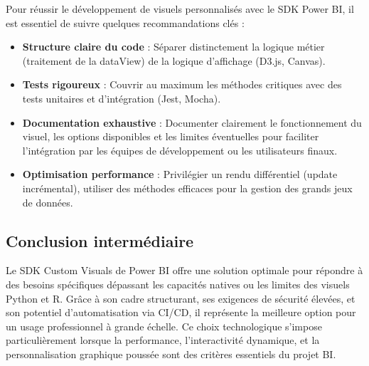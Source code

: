 Pour réussir le développement de visuels personnalisés avec le SDK Power BI, il est essentiel de suivre quelques recommandations clés :
\begin{itemize}
  \item \textbf{Structure claire du code} : Séparer distinctement la logique métier (traitement de la dataView) de la logique d’affichage (D3.js, Canvas).
  \item \textbf{Tests rigoureux} : Couvrir au maximum les méthodes critiques avec des tests unitaires et d’intégration (Jest, Mocha).\
  \item \textbf{Documentation exhaustive} : Documenter clairement le fonctionnement du visuel, les options disponibles et les limites éventuelles pour faciliter l’intégration par les équipes de développement ou les utilisateurs finaux.
  \item \textbf{Optimisation performance} : Privilégier un rendu différentiel (update incrémental), utiliser des méthodes efficaces pour la gestion des grands jeux de données.
\end{itemize}

\subsection*{Conclusion intermédiaire}

Le SDK Custom Visuals de Power BI offre une solution optimale pour répondre à des besoins spécifiques dépassant les capacités natives ou les limites des visuels Python et R. Grâce à son cadre structurant, ses exigences de sécurité élevées, et son potentiel d’automatisation via CI/CD, il représente la meilleure option pour un usage professionnel à grande échelle. Ce choix technologique s’impose particulièrement lorsque la performance, l’interactivité dynamique, et la personnalisation graphique poussée sont des critères essentiels du projet BI.
